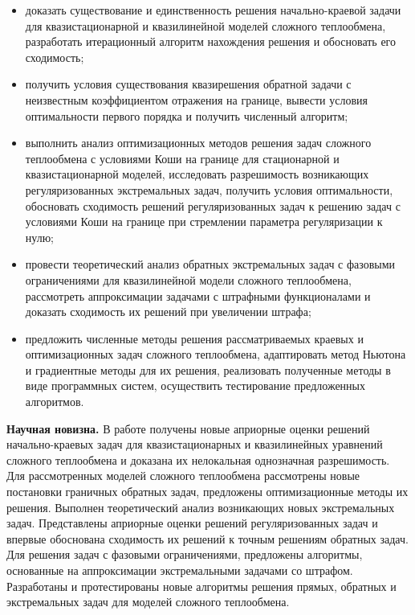 \begin{itemize}[leftmargin=5.5mm]
    \renewcommand\labelitemi{--}
  \item доказать существование и единственность решения начально-краевой
задачи для квазистационарной и квазилинейной моделей сложного теплообмена,
разработать итерационный алгоритм нахождения решения и обосновать его
сходимость;
  \item получить условия существования квазирешения обратной задачи с
неизвестным коэффициентом отражения на границе, вывести условия
оптимальности первого порядка и получить численный алгоритм;
  \item выполнить анализ оптимизационных методов решения задач сложного
теплообмена с условиями Коши на границе для стационарной и
квазистационарной моделей, исследовать разрешимость возникающих
регуляризованных экстремальных задач, получить условия оптимальности,
обосновать сходимость решений регуляризованных задач к решению задач с
условиями Коши на границе при стремлении параметра регуляризации к
нулю;
  \item провести теоретический анализ обратных экстремальных задач с фазовыми
ограничениями для квазилинейной модели сложного теплообмена,
рассмотреть аппроксимации задачами с штрафными функционалами и
доказать сходимость их решений при увеличении штрафа;
    \item предложить численные методы решения рассматриваемых краевых и
оптимизационных задач сложного теплообмена, адаптировать метод
Ньютона и градиентные методы для их решения, реализовать полученные
методы в виде программных систем, осуществить тестирование
предложенных алгоритмов.
\end{itemize}


\textbf{Научная новизна.}
В работе получены новые априорные оценки решений
начально-краевых задач для квазистационарных и квазилинейных уравнений
сложного теплообмена и доказана их нелокальная однозначная
разрешимость.
Для рассмотренных моделей сложного теплообмена
рассмотрены новые постановки граничных обратных задач, предложены
оптимизационные методы их решения.
Выполнен теоретический анализ возникающих новых экстремальных задач.
Представлены априорные оценки решений регуляризованных задач и впервые
обоснована сходимость их решений к точным решениям обратных задач.
Для решения задач с фазовыми ограничениями, предложены алгоритмы,
основанные на аппроксимации экстремальными задачами со штрафом.
Разработаны и протестированы новые алгоритмы решения прямых,
обратных и экстремальных задач для моделей сложного теплообмена.


